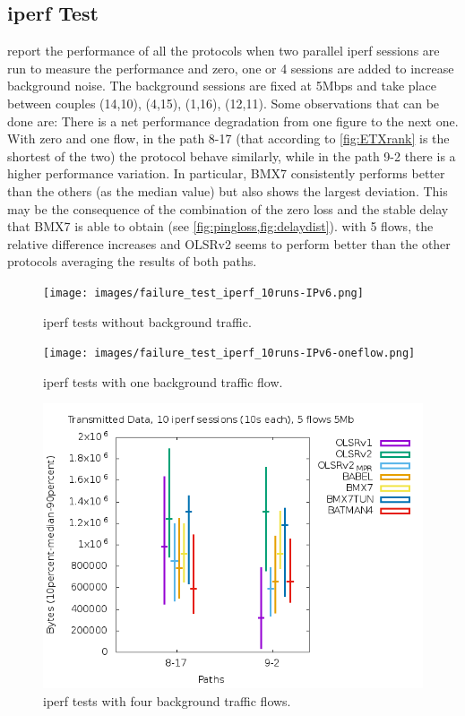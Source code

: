 \documentclass[10pt,onecolumn]{paper}
\begin{document}
\FloatBarrier
\subsection{iperf Test}
 report the performance
of all the protocols when two parallel iperf sessions are run to measure the
performance and zero, one or 4 sessions are added to increase background noise.
The background sessions are fixed at 5Mbps and take place between couples
(14,10), (4,15), (1,16), (12,11). Some observations that can be done are:
\bi
\ii There is a net performance degradation from one figure to the next one. 
\ii With zero and one flow, in the path 8-17 (that according to \cref{fig:ETXrank}
is the shortest of the two) the protocol behave similarly, while in the path 9-2
there is a higher performance variation. In particular, BMX7 consistently
performs better than the others (as the median value) but also shows the largest
deviation. This may be the consequence of the combination of the zero loss and
the stable delay that BMX7 is able to obtain (see \cref{fig:pingloss,fig:delaydist}).
\ii with 5 flows, the relative difference increases and OLSRv2 seems to perform
better than the other protocols averaging the results of both paths.
\ei


\begin{figure}[!htb]
  \centering
    \texttt{[image: images/failure\_test\_iperf\_10runs-IPv6.png]}
    \caption{iperf tests without background traffic.}
  \label{fig:iperfnoflows}
\end{figure}

\begin{figure}[!htb]
  \centering
    \texttt{[image: images/failure\_test\_iperf\_10runs-IPv6-oneflow.png]}
    \caption{iperf tests with one background traffic flow.}
  \label{fig:iperfoneflow}
\end{figure}

\begin{figure}[!htb]
  \centering
    \includegraphics[width=.9\linewidth]{images/failure_test_iperf_10runs-IPv6-twoflow.png}
    \caption{iperf tests with four background traffic flows.}
  \label{fig:iperffourflows}
\end{figure}
\end{document}
